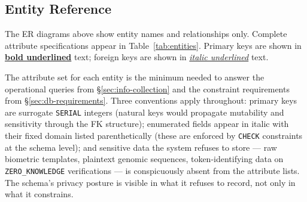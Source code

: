\documentclass[11pt,letterpaper]{article}
\begin{document}
\subsection{Entity Reference}

The ER diagrams above show entity names and relationships only. Complete attribute specifications appear in Table~\ref{tab:entities}. Primary keys are shown in \textbf{\underline{bold underlined}} text; foreign keys are shown in \textit{\underline{italic underlined}} text.

The attribute set for each entity is the minimum needed to answer the operational queries from §\ref{sec:info-collection} and the constraint requirements from §\ref{sec:db-requirements}. Three conventions apply throughout: primary keys are surrogate \texttt{SERIAL} integers (natural keys would propagate mutability and sensitivity through the FK structure); enumerated fields appear in italic with their fixed domain listed parenthetically (these are enforced by \texttt{CHECK} constraints at the schema level); and sensitive data the system refuses to store --- raw biometric templates, plaintext genomic sequences, token-identifying data on \texttt{ZERO\_KNOWLEDGE} verifications --- is conspicuously absent from the attribute lists. The schema's privacy posture is visible in what it refuses to record, not only in what it constrains.
\end{document}
